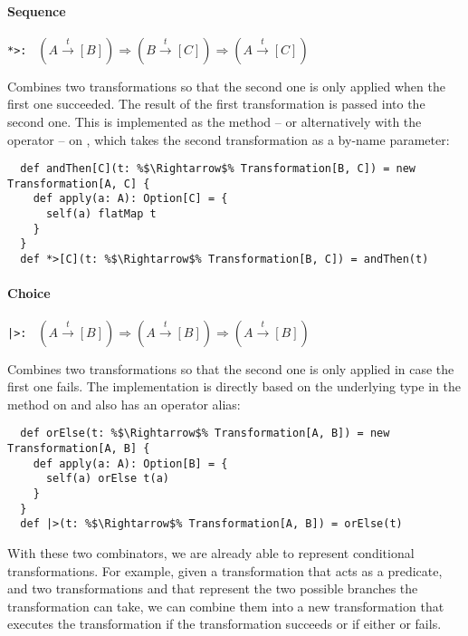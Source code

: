 \documentclass[10pt,a4paper,oneside]{scrreprt}
\begin{document}
\paragraph{Sequence} \hfill \lstinline{*>: } $(A \overset{t}{\rightarrow} [B]) \Rightarrow (B \overset{t}{\rightarrow} [C]) \Rightarrow (A \overset{t}{\rightarrow} [C])$

\vspace{7pt} Combines two transformations so that the second one is only applied when the first one succeeded. The result of the first transformation is passed into the second one. This is implemented as the  method -- or alternatively with the \src{*>} operator -- on , which takes the second transformation as a by-name parameter:

\begin{lstlisting}
  def andThen[C](t: %$\Rightarrow$% Transformation[B, C]) = new Transformation[A, C] {
    def apply(a: A): Option[C] = {
      self(a) flatMap t
    }
  }
  def *>[C](t: %$\Rightarrow$% Transformation[B, C]) = andThen(t)
\end{lstlisting}


\paragraph{Choice} \hfill \lstinline{|>: } $(A \overset{t}{\rightarrow} [B]) \Rightarrow (A \overset{t}{\rightarrow} [B]) \Rightarrow (A \overset{t}{\rightarrow} [B])$

\vspace{7pt} Combines two transformations so that the second one is only applied in case the first one fails. The implementation is directly based on the underlying  type in the  method on  and also has an operator alias:

\begin{lstlisting}
  def orElse(t: %$\Rightarrow$% Transformation[A, B]) = new Transformation[A, B] {
    def apply(a: A): Option[B] = {
      self(a) orElse t(a)
    }
  }
  def |>(t: %$\Rightarrow$% Transformation[A, B]) = orElse(t)
\end{lstlisting}

With these two combinators, we are already able to represent conditional transformations. For example, given a transformation  that acts as a predicate, and two transformations  and  that represent the two possible branches the transformation can take, we can combine them into a new transformation  that executes the  transformation if the  transformation succeeds or  if either  or  fails.
\end{document}
